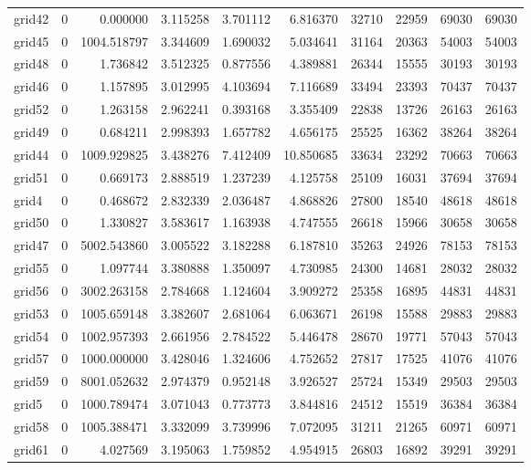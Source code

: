 \begin{longtable}{|l|r|r|r|r|r|r|r|r|r|}
grid42 & 0 & 0.000000 & 3.115258 & 3.701112 & 6.816370 & 32710 & 22959 & 69030 & 69030 \\
grid45 & 0 & 1004.518797 & 3.344609 & 1.690032 & 5.034641 & 31164 & 20363 & 54003 & 54003 \\
grid48 & 0 & 1.736842 & 3.512325 & 0.877556 & 4.389881 & 26344 & 15555 & 30193 & 30193 \\
grid46 & 0 & 1.157895 & 3.012995 & 4.103694 & 7.116689 & 33494 & 23393 & 70437 & 70437 \\
grid52 & 0 & 1.263158 & 2.962241 & 0.393168 & 3.355409 & 22838 & 13726 & 26163 & 26163 \\
grid49 & 0 & 0.684211 & 2.998393 & 1.657782 & 4.656175 & 25525 & 16362 & 38264 & 38264 \\
grid44 & 0 & 1009.929825 & 3.438276 & 7.412409 & 10.850685 & 33634 & 23292 & 70663 & 70663 \\
grid51 & 0 & 0.669173 & 2.888519 & 1.237239 & 4.125758 & 25109 & 16031 & 37694 & 37694 \\
grid4 & 0 & 0.468672 & 2.832339 & 2.036487 & 4.868826 & 27800 & 18540 & 48618 & 48618 \\
grid50 & 0 & 1.330827 & 3.583617 & 1.163938 & 4.747555 & 26618 & 15966 & 30658 & 30658 \\
grid47 & 0 & 5002.543860 & 3.005522 & 3.182288 & 6.187810 & 35263 & 24926 & 78153 & 78153 \\
grid55 & 0 & 1.097744 & 3.380888 & 1.350097 & 4.730985 & 24300 & 14681 & 28032 & 28032 \\
grid56 & 0 & 3002.263158 & 2.784668 & 1.124604 & 3.909272 & 25358 & 16895 & 44831 & 44831 \\
grid53 & 0 & 1005.659148 & 3.382607 & 2.681064 & 6.063671 & 26198 & 15588 & 29883 & 29883 \\
grid54 & 0 & 1002.957393 & 2.661956 & 2.784522 & 5.446478 & 28670 & 19771 & 57043 & 57043 \\
grid57 & 0 & 1000.000000 & 3.428046 & 1.324606 & 4.752652 & 27817 & 17525 & 41076 & 41076 \\
grid59 & 0 & 8001.052632 & 2.974379 & 0.952148 & 3.926527 & 25724 & 15349 & 29503 & 29503 \\
grid5 & 0 & 1000.789474 & 3.071043 & 0.773773 & 3.844816 & 24512 & 15519 & 36384 & 36384 \\
grid58 & 0 & 1005.388471 & 3.332099 & 3.739996 & 7.072095 & 31211 & 21265 & 60971 & 60971 \\
grid61 & 0 & 4.027569 & 3.195063 & 1.759852 & 4.954915 & 26803 & 16892 & 39291 & 39291 \\

\end{longtable}
